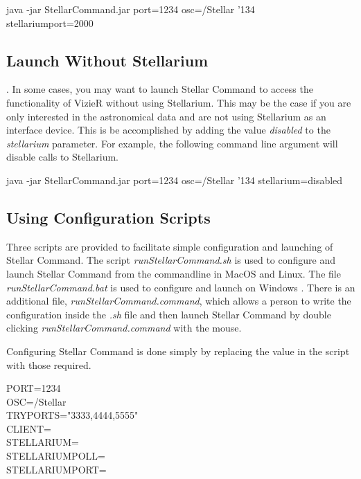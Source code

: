 \begin{syntax} 
	\medskip
	java -jar StellarCommand.jar port=1234 osc=/Stellar  {\char'134}\\stellariumport=2000 
	\medskip
\end{syntax}
\bigskip

\subsection{Launch Without Stellarium}\label{sec:launchnostellarium}. In some cases, you may want to launch Stellar Command to access the functionality of VizieR without using Stellarium. This may be the case if you are only interested in the astronomical data and are not using Stellarium as an interface device. This  is be accomplished by adding the value \textit{disabled} to the \textit{stellarium} parameter. For example, the following command line argument will disable calls to Stellarium.

 \begin{syntax}  
	\medskip
	java -jar StellarCommand.jar port=1234 osc=/Stellar  {\char'134} stellarium=disabled\\
	\medskip
\end{syntax}
\bigskip



\subsection{Using Configuration Scripts}\label{sec:configscript}
Three scripts are provided to facilitate simple configuration and launching of  Stellar Command. The script \textit{runStellarCommand.sh} is used to configure and launch Stellar Command from the commandline in MacOS and Linux.    The file \textit{runStellarCommand.bat} is used to configure and launch on Windows  . There is an additional file, \textit{runStellarCommand.command}, which allows a person to write the configuration inside the \textit{.sh} file and then launch Stellar Command by double clicking \textit{runStellarCommand.command} with the mouse.

Configuring Stellar Command is done simply by replacing the value in the script with those required.
 \begin{syntax} 
	\medskip
PORT=1234\\
OSC=/Stellar\\
TRYPORTS="3333,4444,5555"\\
CLIENT=\\
STELLARIUM=\\ 
STELLARIUMPOLL=\\
STELLARIUMPORT=\\
	\medskip
\end{syntax}
\bigskip

